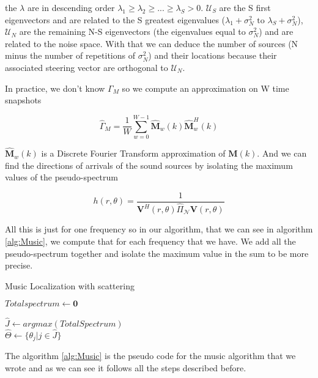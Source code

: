 the $\lambda$ are in descending order $\lambda_1 \geq \lambda_2 \geq ... \geq \lambda_S > 0$. $\mathcal{U}_S$ are the S first eigenvectors and are related to the S greatest eigenvalues ($\lambda_1 + \sigma_N^2 \text{ to } \lambda_S + \sigma_N^2$),  $\mathcal{U}_N$ are the remaining N-S eigenvectors (the eigenvalues equal to $\sigma_N^2$) and are related to the noise space. With that we can deduce the number of sources (N minus the number of repetitions of $\sigma_N^2$) and their locations because their associated steering vector are orthogonal to $\mathcal{U}_N$.

In practice, we don't know $\Gamma_M$ so we compute an approximation on W time snapshots 

\begin{equation}
    \hat \Gamma_M = \frac{1}{W} \sum_{w=0}^{W-1} \boldsymbol{\hat M}_w(k) \boldsymbol{\hat M}_w^H(k)
\end{equation}

$\boldsymbol{\hat M}_w(k)$ is a Discrete Fourier Transform approximation of $\boldsymbol M(k)$. And we can find the directions of arrivals of the sound sources by isolating the maximum values of the pseudo-spectrum

\begin{equation}
    h(r,\theta) = \frac{1}{\boldsymbol V^H(r,\theta) \hat \Pi_\mathcal{N} \boldsymbol V(r,\theta)}
\end{equation}

All this is just for one frequency so in our algorithm, that we can see in algorithm \ref{alg:Music}, we compute that for each frequency that we have. We add all the pseudo-spectrum together and isolate the maximum value in the sum to be more precise.

\begin{algorithm}[H]
\caption{Music Localization with scattering}\label{alg:Music}
  $Totalspectrum \gets \boldsymbol0$
  
    $\hat J \gets  argmax(TotalSpectrum)$
    \\$\hat \Theta \gets \{\theta _j | j \in \hat J\} $
\end{algorithm}
    
The algorithm \ref{alg:Music} is the pseudo code for the music algorithm that we wrote and as we can see it follows all the steps described before.
